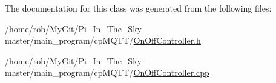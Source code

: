 The documentation for this class was generated from the following files\+:\begin{DoxyCompactItemize}
\item 
/home/rob/\+My\+Git/\+Pi\+\_\+\+In\+\_\+\+The\+\_\+\+Sky-\/master/main\+\_\+program/cp\+M\+Q\+T\+T/\hyperlink{_on_off_controller_8h}{On\+Off\+Controller.\+h}\item 
/home/rob/\+My\+Git/\+Pi\+\_\+\+In\+\_\+\+The\+\_\+\+Sky-\/master/main\+\_\+program/cp\+M\+Q\+T\+T/\hyperlink{_on_off_controller_8cpp}{On\+Off\+Controller.\+cpp}\end{DoxyCompactItemize}
